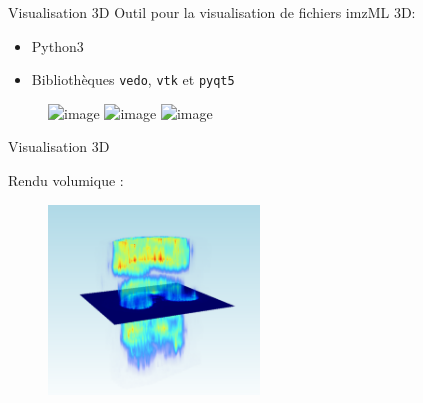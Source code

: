 \documentclass[10pt]{beamer}
\begin{document}
\begin{frame}{Visualisation 3D}
  Outil pour la visualisation de fichiers imzML 3D:
  \begin{itemize}
  \item Python3
  \item Bibliothèques \texttt{vedo}, \texttt{vtk} et \texttt{pyqt5}
  \end{itemize}

  \vspace{-0.2cm}
  
  \begin{figure}[ht]
    \centering
    \includegraphics<1>[width=0.95\textwidth]{fig/visu}%
    \includegraphics<2>[width=0.95\textwidth]{fig/visu2}%
    \includegraphics<3>[width=0.95\textwidth]{fig/visu3}
    \caption{}
    \label{fig:visu}
  \end{figure}

\end{frame}

\begin{frame}{Visualisation 3D}
  
  Rendu volumique :
  \begin{figure}[ht]
    \centering
    \includegraphics[width=0.5\textwidth]{fig/visu_3d.png}
    \caption{}
    \label{fig:visu_3d.png}
  \end{figure}

\end{frame}
\end{document}
